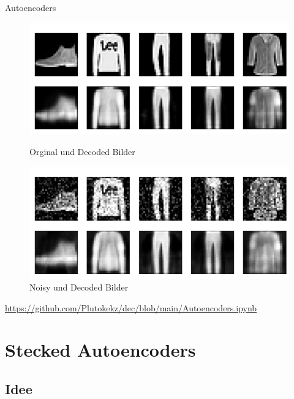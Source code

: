 \documentclass{beamer}
\begin{document}
\begin{frame}[t]{Autoencoders}\vspace{4pt}
\begin{figure}
\center
\includegraphics[scale=0.315]{AutoencoderResult.png}
{\fontsize{5}{6}\selectfont \caption{Orginal und Decoded Bilder}}
\includegraphics[scale=0.315]{DenosingAutoencoderResult.png}
{\fontsize{5}{6}\selectfont \caption{Noisy und Decoded Bilder}}
\end{figure}
\tiny{\url{https://github.com/Plutokekz/dec/blob/main/Autoencoders.ipynb}}
\end{frame}

\section[]{Stecked Autoencoders}
	\subsection{Idee}
\end{document}
